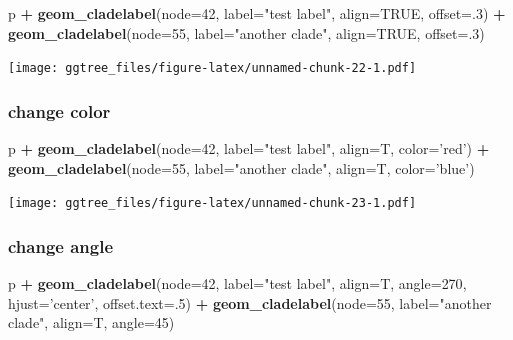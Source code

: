 \documentclass[]{article}
\newenvironment{Shaded}{\begin{snugshade}}{\end{snugshade}}
\newcommand{\KeywordTok}[1]{\textcolor[rgb]{0.13,0.29,0.53}{\textbf{#1}}}
\newcommand{\DataTypeTok}[1]{\textcolor[rgb]{0.13,0.29,0.53}{#1}}
\newcommand{\DecValTok}[1]{\textcolor[rgb]{0.00,0.00,0.81}{#1}}
\newcommand{\StringTok}[1]{\textcolor[rgb]{0.31,0.60,0.02}{#1}}
\newcommand{\OtherTok}[1]{\textcolor[rgb]{0.56,0.35,0.01}{#1}}
\newcommand{\OperatorTok}[1]{\textcolor[rgb]{0.81,0.36,0.00}{\textbf{#1}}}
\newcommand{\NormalTok}[1]{#1}
\begin{document}
\begin{Shaded}
\begin{Highlighting}[]
\NormalTok{p }\OperatorTok{+}\StringTok{ }\KeywordTok{geom_cladelabel}\NormalTok{(}\DataTypeTok{node=}\DecValTok{42}\NormalTok{, }\DataTypeTok{label=}\StringTok{"test label"}\NormalTok{, }\DataTypeTok{align=}\OtherTok{TRUE}\NormalTok{, }\DataTypeTok{offset=}\NormalTok{.}\DecValTok{3}\NormalTok{) }\OperatorTok{+}
\StringTok{  }\KeywordTok{geom_cladelabel}\NormalTok{(}\DataTypeTok{node=}\DecValTok{55}\NormalTok{, }\DataTypeTok{label=}\StringTok{"another clade"}\NormalTok{, }\DataTypeTok{align=}\OtherTok{TRUE}\NormalTok{, }\DataTypeTok{offset=}\NormalTok{.}\DecValTok{3}\NormalTok{)}
\end{Highlighting}
\end{Shaded}

\texttt{[image: ggtree\_files/figure-latex/unnamed-chunk-22-1.pdf]}

\subsubsection{change color}\label{change-color}

\begin{Shaded}
\begin{Highlighting}[]
\NormalTok{p }\OperatorTok{+}\StringTok{ }\KeywordTok{geom_cladelabel}\NormalTok{(}\DataTypeTok{node=}\DecValTok{42}\NormalTok{, }\DataTypeTok{label=}\StringTok{"test label"}\NormalTok{, }\DataTypeTok{align=}\NormalTok{T, }\DataTypeTok{color=}\StringTok{'red'}\NormalTok{) }\OperatorTok{+}
\StringTok{  }\KeywordTok{geom_cladelabel}\NormalTok{(}\DataTypeTok{node=}\DecValTok{55}\NormalTok{, }\DataTypeTok{label=}\StringTok{"another clade"}\NormalTok{, }\DataTypeTok{align=}\NormalTok{T, }\DataTypeTok{color=}\StringTok{'blue'}\NormalTok{)}
\end{Highlighting}
\end{Shaded}

\texttt{[image: ggtree\_files/figure-latex/unnamed-chunk-23-1.pdf]}

\subsubsection{change angle}\label{change-angle}

\begin{Shaded}
\begin{Highlighting}[]
\NormalTok{p }\OperatorTok{+}\StringTok{ }\KeywordTok{geom_cladelabel}\NormalTok{(}\DataTypeTok{node=}\DecValTok{42}\NormalTok{, }\DataTypeTok{label=}\StringTok{"test label"}\NormalTok{, }\DataTypeTok{align=}\NormalTok{T, }\DataTypeTok{angle=}\DecValTok{270}\NormalTok{, }\DataTypeTok{hjust=}\StringTok{'center'}\NormalTok{, }\DataTypeTok{offset.text=}\NormalTok{.}\DecValTok{5}\NormalTok{) }\OperatorTok{+}
\StringTok{  }\KeywordTok{geom_cladelabel}\NormalTok{(}\DataTypeTok{node=}\DecValTok{55}\NormalTok{, }\DataTypeTok{label=}\StringTok{"another clade"}\NormalTok{, }\DataTypeTok{align=}\NormalTok{T, }\DataTypeTok{angle=}\DecValTok{45}\NormalTok{)}
\end{Highlighting}
\end{Shaded}
\end{document}
